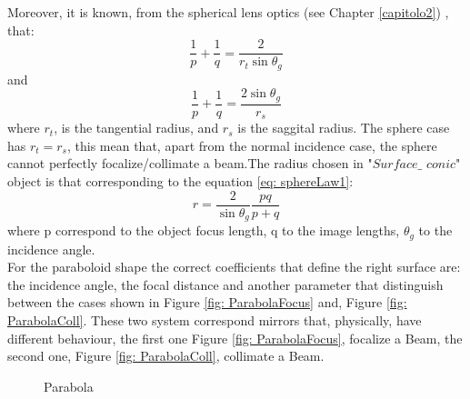 Moreover, it is known, from the spherical lens optics (see Chapter \ref{capitolo2}) , that:
\begin{equation}
\frac{1}{p} + \frac{1}{q} = \frac{2}{r_t \sin \theta_g}
\label{eq: sphereLaw1}
\end{equation}
and
\begin{equation}
\frac{1}{p} + \frac{1}{q} = \frac{2 \sin \theta_g}{r_s}
\label{eq: sphereLaw2}
\end{equation}
where $r_t $, is the tangential radius, and $r_s $ is the saggital radius. The sphere case has $r_t = r_s $, this mean that, apart from the normal incidence case, the sphere cannot perfectly focalize/collimate a beam.The radius chosen in "$Surface\_$ $conic$" object is that corresponding to the equation \ref{eq: sphereLaw1}: 
\begin{equation}
r = \frac{2}{\sin \theta_g} \frac{pq}{p + q}
\end{equation}
where p correspond to the object focus length, q to the image lengths, $\theta_g $ to the incidence angle.
\\
For the paraboloid shape the correct coefficients that define the right surface are: the incidence angle, the focal distance and another parameter that distinguish between the cases shown in Figure \ref{fig: ParabolaFocus} and, Figure \ref{fig: ParabolaColl}. These two system correspond mirrors that, physically, have different behaviour, the first one Figure \ref{fig: ParabolaFocus}, focalize a Beam, the second one, Figure \ref{fig: ParabolaColl}, collimate a Beam.
\begin{figure}[H]
%
\centering
%
\quad
%
%
\caption{Parabola}
\label{fig :p3}
\end{figure}
